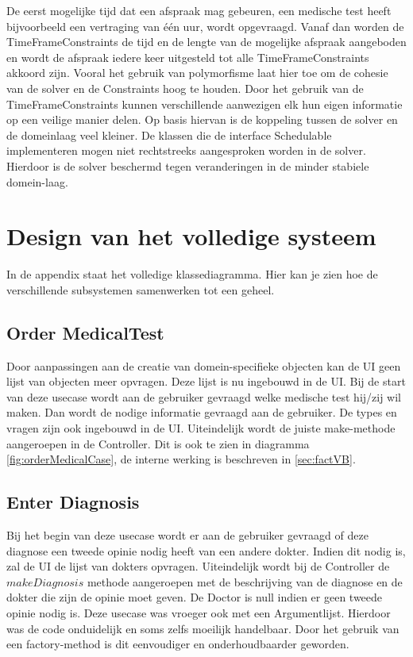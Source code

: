 De eerst mogelijke tijd dat een afspraak mag gebeuren, een medische test heeft bijvoorbeeld een vertraging van één uur, wordt opgevraagd. 
Vanaf dan worden de TimeFrameConstraints de tijd en de lengte van de mogelijke afspraak aangeboden en wordt de afspraak iedere keer uitgesteld tot alle TimeFrameConstraints akkoord zijn. 
Vooral het gebruik van polymorfisme laat hier toe om de cohesie van de solver en de Constraints hoog te houden. 
Door het gebruik van de TimeFrameConstraints kunnen verschillende aanwezigen elk hun eigen informatie op een veilige manier delen. 
Op basis hiervan is de koppeling tussen de solver en de domeinlaag veel kleiner. 
De klassen die de interface Schedulable implementeren mogen niet rechtstreeks aangesproken worden in de solver. 
Hierdoor is de solver beschermd tegen veranderingen in de minder stabiele domein-laag.

\section{Design van het volledige systeem\label{Volledig}}
In de appendix staat het volledige klassediagramma. Hier kan je zien hoe de verschillende subsystemen samenwerken tot een geheel.

\subsection{Order MedicalTest\label{use:Med}}
Door aanpassingen aan de creatie van domein-specifieke objecten kan de UI geen lijst van objecten meer opvragen. 
Deze lijst is nu ingebouwd in de UI. 
Bij de start van deze usecase wordt aan de gebruiker gevraagd welke medische test hij/zij wil maken. 
Dan wordt de nodige informatie gevraagd aan de gebruiker. De types en vragen zijn ook ingebouwd in de UI.
Uiteindelijk wordt de juiste make-methode aangeroepen in de Controller. 
Dit is ook te zien in diagramma \ref{fig:orderMedicalCase}, de interne werking is beschreven in \ref{sec:factVB}.

\subsection{Enter Diagnosis}
Bij het begin van deze usecase wordt er aan de gebruiker gevraagd of deze diagnose een tweede opinie nodig heeft van een andere dokter.
Indien dit nodig is, zal de UI de lijst van dokters opvragen. 
Uiteindelijk wordt bij de Controller de $makeDiagnosis$ methode aangeroepen met de beschrijving van de diagnose en de dokter die zijn de opinie moet geven.
De Doctor is null indien er geen tweede opinie nodig is.
Deze usecase was vroeger ook met een Argumentlijst. Hierdoor was de code onduidelijk en soms zelfs moeilijk handelbaar. 
Door het gebruik van een factory-method is dit eenvoudiger en onderhoudbaarder geworden.

